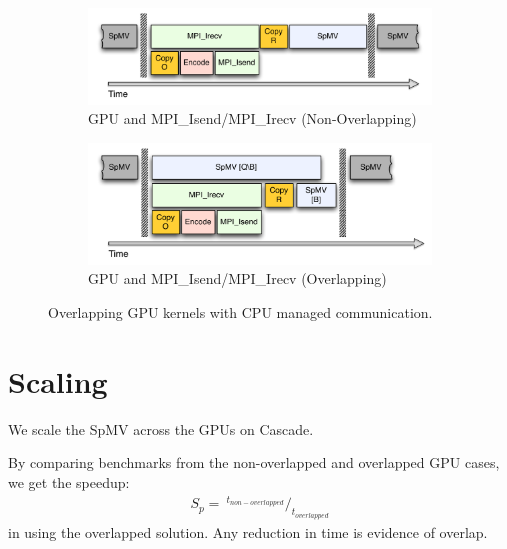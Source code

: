 \documentclass{report}
\begin{document}
 
\begin{figure} 
\centering
\begin{subfigure}{0.48\textwidth}
\centering
\includegraphics[width=\textwidth]{../figures/omnigraffle/GPU_IsendIrecv.pdf}
\caption{GPU and MPI\_Isend/MPI\_Irecv (Non-Overlapping)}
\label{fig:isendirecv_gpu}
\end{subfigure}
\quad
\begin{subfigure}{0.48\textwidth}
\centering
\includegraphics[width=\textwidth]{../figures/omnigraffle/GPU_OverlapGPU.pdf}
\caption{GPU and MPI\_Isend/MPI\_Irecv (Overlapping)}
\label{fig:overlap_gpu}
\end{subfigure}
\caption{Overlapping GPU kernels with CPU managed communication. } 
\label{fig:gpu_mpi_tuning}
\end{figure}

\section{Scaling}
We scale the SpMV across the GPUs on Cascade.


By comparing benchmarks from the non-overlapped and overlapped GPU cases, we get the speedup: 
\begin{align*} 
S_p = \ ^{t_{non-overlapped}} /_{t_{overlapped}}
\end{align*}
in using the overlapped solution. Any reduction in time is evidence of overlap. 

\end{document}
